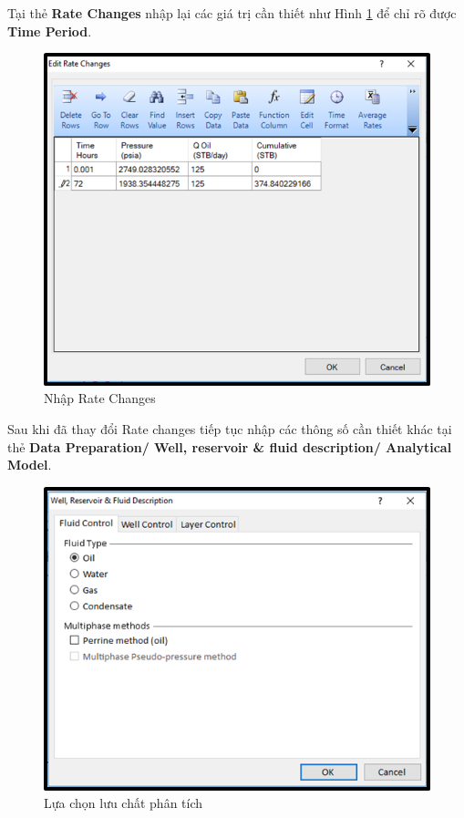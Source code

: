 \documentclass[12pt,a4paper]{report}
\begin{document}
    \clearpage
    \noindent
Tại thẻ \textbf{Rate Changes} nhập lại các giá trị cần thiết như Hình \ref{fig:rate_well} để chỉ rõ được \textbf{Time Period}.
	\begin{figure}[h]
    	\centering
        \includegraphics[scale=1]{welltest/rate_changes.png}
        \caption{Nhập Rate Changes}
        \label{fig:rate_well}
    \end{figure}
    \newpage
    \noindent
Sau khi đã thay đổi Rate changes tiếp tục nhập các thông số cần thiết khác tại thẻ \textbf{Data Preparation/ Well, reservoir \& fluid description/ Analytical Model}.
	\begin{figure}[h]
    	\centering
        \includegraphics[scale=1]{welltest/fluid_des.png}
        \caption{Lựa chọn lưu chất phân tích}
        \label{fig:fluid_des}
    \end{figure}
\end{document}
